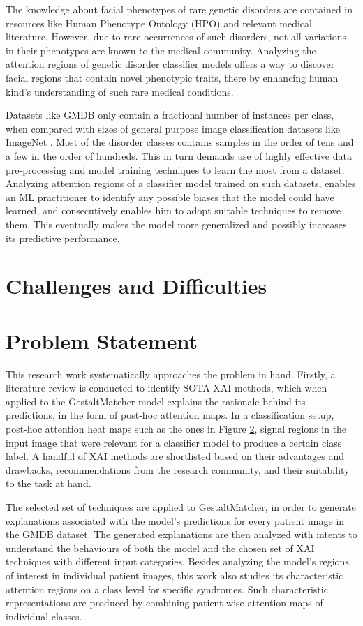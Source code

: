 \documentclass[../report.tex]{subfiles}
\begin{document}
    The knowledge about facial phenotypes of rare genetic disorders are contained in resources like Human Phenotype Ontology (HPO) \cite{hpo} and relevant medical literature. However, due to rare occurrences of such disorders, not all variations in their phenotypes are known to the medical community. Analyzing the attention regions of genetic disorder classifier models offers a way to discover facial regions that contain novel phenotypic traits, there by enhancing human kind's understanding of such rare medical conditions.
    
    Datasets like GMDB \cite{gmdb} only contain a fractional number of instances per class, when compared with sizes of general purpose image classification datasets like ImageNet \cite{deng2009imagenet}. Most of the disorder classes contains samples in the order of tens and a few in the order of hundreds. This in turn demands use of highly effective data pre-processing and model training techniques to learn the most from a dataset. Analyzing attention regions of a classifier model trained on such datasets, enables an ML practitioner to identify any possible biases that the model could have learned, and consecutively enables him to adopt suitable techniques to remove them. This eventually makes the model more generalized and possibly increases its predictive performance. 
    
    \section{Challenges and Difficulties} \label{sec_challenges}


   
    \section{Problem Statement}
 	This research work systematically approaches the problem in hand. Firstly, a literature review is conducted to identify SOTA XAI methods, which when applied to the GestaltMatcher model explains the rationale behind its predictions, in the form of post-hoc attention maps. In a classification setup, post-hoc attention heat maps such as the ones in Figure \ref{}, signal regions in the input image that were relevant for a classifier model to produce a certain class label. A handful of XAI methods are shortlisted based on their advantages and drawbacks, recommendations from the research community, and their suitability to the task at hand. 
 	
 	The selected set of techniques are applied to GestaltMatcher, in order to generate explanations associated with the model's predictions for every patient image in the GMDB \cite{hsieh2022gestaltmatcher} dataset. The generated explanations are then analyzed with intents to understand the behaviours of both the model and the chosen set of XAI techniques with different input categories. Besides analyzing the model's regions of interest in individual patient images, this work also studies its characteristic attention regions on a class level for specific syndromes. Such characteristic representations are produced by combining patient-wise attention maps of individual classes. 
 	
\end{document}
